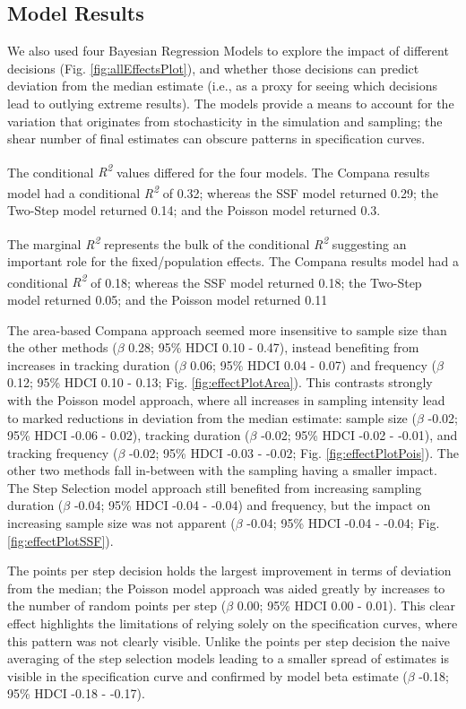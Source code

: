 \documentclass[10pt,a4paper]{article}
\begin{document}
\subsection{Model Results}\label{model-results}

We also used four Bayesian Regression Models to explore the impact of different decisions (Fig. \ref{fig:allEffectsPlot}), and whether those decisions can predict deviation from the median estimate (i.e., as a proxy for seeing which decisions lead to outlying extreme results).
The models provide a means to account for the variation that originates from stochasticity in the simulation and sampling; the shear number of final estimates can obscure patterns in specification curves.

The conditional \emph{R\textsuperscript{2}} values differed for the four models.
The Compana results model had a conditional \emph{R\textsuperscript{2}} of 0.32; whereas the SSF model returned 0.29; the Two-Step model returned 0.14; and the Poisson model returned 0.3.

The marginal \emph{R\textsuperscript{2}} represents the bulk of the conditional \emph{R\textsuperscript{2}} suggesting an important role for the fixed/population effects.
The Compana results model had a conditional \emph{R\textsuperscript{2}} of 0.18; whereas the SSF model returned 0.18; the Two-Step model returned 0.05; and the Poisson model returned 0.11

The area-based Compana approach seemed more insensitive to sample size than the other methods (\(\beta\) 0.28; 95\% HDCI 0.10 - 0.47), instead benefiting from increases in tracking duration (\(\beta\) 0.06; 95\% HDCI 0.04 - 0.07) and frequency (\(\beta\) 0.12; 95\% HDCI 0.10 - 0.13; Fig. \ref{fig:effectPlotArea}).
This contrasts strongly with the Poisson model approach, where all increases in sampling intensity lead to marked reductions in deviation from the median estimate: sample size (\(\beta\) -0.02; 95\% HDCI -0.06 - 0.02), tracking duration (\(\beta\) -0.02; 95\% HDCI -0.02 - -0.01), and tracking frequency (\(\beta\) -0.02; 95\% HDCI -0.03 - -0.02; Fig. \ref{fig:effectPlotPois}).
The other two methods fall in-between with the sampling having a smaller impact.
The Step Selection model approach still benefited from increasing sampling duration (\(\beta\) -0.04; 95\% HDCI -0.04 - -0.04) and frequency, but the impact on increasing sample size was not apparent (\(\beta\) -0.04; 95\% HDCI -0.04 - -0.04; Fig. \ref{fig:effectPlotSSF}).

The points per step decision holds the largest improvement in terms of deviation from the median; the Poisson model approach was aided greatly by increases to the number of random points per step (\(\beta\) 0.00; 95\% HDCI 0.00 - 0.01).
This clear effect highlights the limitations of relying solely on the specification curves, where this pattern was not clearly visible.
Unlike the points per step decision the naive averaging of the step selection models leading to a smaller spread of estimates is visible in the specification curve and confirmed by model beta estimate (\(\beta\) -0.18; 95\% HDCI -0.18 - -0.17).
\end{document}
